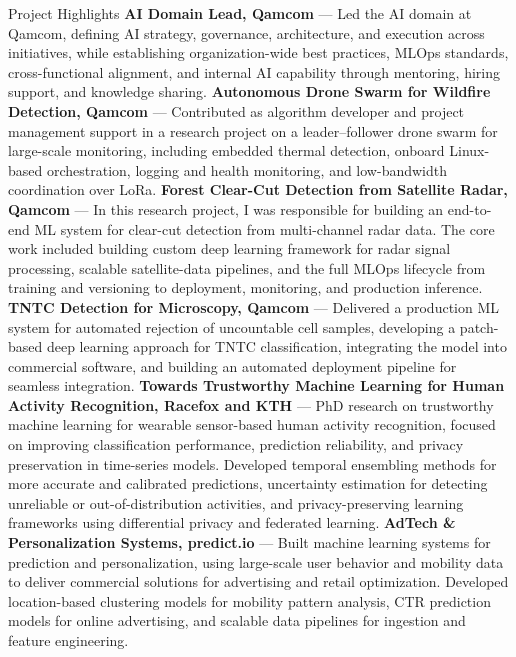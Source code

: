 \begin{rubric}{Project Highlights}
\entry*[2023 -- present]%
	\textbf{AI Domain Lead, Qamcom} — Led the AI domain at Qamcom, defining AI strategy, governance, architecture, and execution across initiatives, while establishing organization-wide best practices, MLOps standards, cross-functional alignment, and internal AI capability through mentoring, hiring support, and knowledge sharing.
%
\entry*[2025 -- present]%
	\textbf{Autonomous Drone Swarm for Wildfire Detection, Qamcom} — Contributed as algorithm developer and project management support in a research project on a leader–follower drone swarm for large-scale monitoring, including embedded thermal detection, onboard Linux-based orchestration, logging and health monitoring, and low-bandwidth coordination over LoRa.
%
\entry*[2023 -- 2026]%
	\textbf{Forest Clear-Cut Detection from Satellite Radar, Qamcom} — In this research project, I was responsible for building an end-to-end ML system for clear-cut detection from multi-channel radar data. The core work included building custom deep learning framework for radar signal processing, scalable satellite-data pipelines, and the full MLOps lifecycle from training and versioning to deployment, monitoring, and production inference.
%
\entry*[2025 -- 2026]%
	\textbf{TNTC Detection for Microscopy, Qamcom} — Delivered a production ML system for automated rejection of uncountable cell samples, developing a patch-based deep learning approach for TNTC classification, integrating the model into commercial software, and building an automated deployment pipeline for seamless integration.
%
\entry*[2020 -- 2024]%
	\textbf{Towards Trustworthy Machine Learning for Human Activity Recognition, Racefox and KTH} — PhD research on trustworthy machine learning for wearable sensor-based human activity recognition, focused on improving classification performance, prediction reliability, and privacy preservation in time-series models. Developed temporal ensembling methods for more accurate and calibrated predictions, uncertainty estimation for detecting unreliable or out-of-distribution activities, and privacy-preserving learning frameworks using differential privacy and federated learning.
%
\entry*[2017 -- 2019]%
	\textbf{AdTech \& Personalization Systems, predict.io} — Built machine learning systems for prediction and personalization, using large-scale user behavior and mobility data to deliver commercial solutions for advertising and retail optimization. Developed location-based clustering models for mobility pattern analysis, CTR prediction models for online advertising, and scalable data pipelines for ingestion and feature engineering.
%
\end{rubric}

